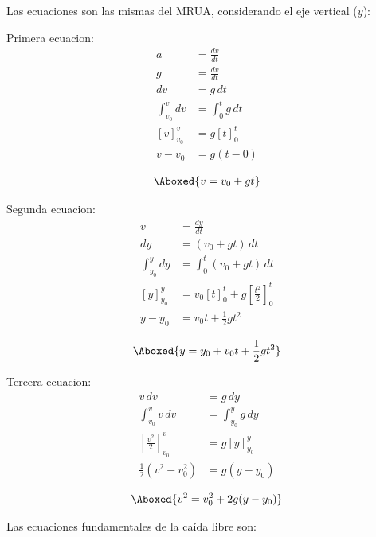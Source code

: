 Las ecuaciones son las mismas del MRUA, considerando el eje vertical ($y$):

Primera ecuacion:
\begin{align*}
a &= \frac{dv}{dt} \\
g &= \frac{dv}{dt} \\
dv &= g\,dt \\
\int_{v_0}^{v} dv &= \int_{0}^{t} g\,dt \\
\left[v\right]_{v_0}^{v} &= g\left[t\right]_{0}^{t} \\
v - v_0 &= g(t - 0)
\end{align*}

\vspace{-30pt}

\begin{align*}
    \Aboxed{v = v_0 + gt}
\end{align*}

Segunda ecuacion:
\begin{align*}
v &= \frac{dy}{dt} \\
dy &= (v_0 + gt)\,dt \\
\int_{y_0}^{y} dy &= \int_{0}^{t} (v_0 + gt)\,dt \\
\left[y\right]_{y_0}^{y} &= v_0\left[t\right]_{0}^{t} + g\left[\frac{t^2}{2}\right]_{0}^{t} \\
y - y_0 &= v_0 t + \frac{1}{2}gt^2
\end{align*}

\vspace{-20pt}

\begin{align*}
    \Aboxed{y = y_0 + v_0 t + \frac{1}{2}gt^2}
\end{align*}

Tercera ecuacion:
\begin{align*}
v\,dv &= g\,dy \\
\int_{v_0}^{v} v\,dv &= \int_{y_0}^{y} g\,dy \\
\left[\frac{v^2}{2}\right]_{v_0}^{v} &= g\left[y\right]_{y_0}^{y} \\
\frac{1}{2}(v^2 - v_0^2) &= g(y - y_0)
\end{align*}

\vspace{-30pt}

\begin{align*}
    \Aboxed{v^2 = v_0^2 + 2g(y - y_0)}
\end{align*}

Las ecuaciones fundamentales de la caída libre son:

